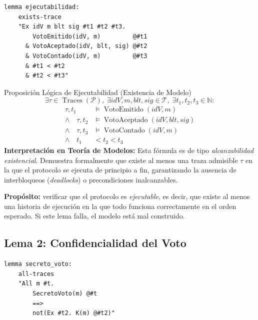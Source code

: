 \documentclass[12pt, a4paper, twoside, openright]{book}
\begin{document}
\begin{lstlisting}[caption={Lema de ejecutabilidad del protocolo completo.}]
lemma ejecutabilidad:
    exists-trace
    "Ex idV m blt sig #t1 #t2 #t3.
        VotoEmitido(idV, m)         @#t1
      & VotoAceptado(idV, blt, sig) @#t2
      & VotoContado(idV, m)         @#t3
      & #t1 < #t2
      & #t2 < #t3"
\end{lstlisting}

\begin{cajaLogica}{Proposici\'on L\'ogica de Ejecutabilidad (Existencia de Modelo)}
  \[
    \exists \tau \in \operatorname{Traces}(\mathcal{P}),\; \exists \mathit{idV}, m, \mathit{blt}, \mathit{sig} \in \mathcal{T},\; \exists t_1, t_2, t_3 \in \mathbb{N}:
  \]
  \[
    \begin{aligned}
      \tau, t_1 &\models \operatorname{VotoEmitido}(\mathit{idV}, m) \\
      \land\quad \tau, t_2 &\models \operatorname{VotoAceptado}(\mathit{idV}, \mathit{blt}, \mathit{sig}) \\
      \land\quad \tau, t_3 &\models \operatorname{VotoContado}(\mathit{idV}, m) \\
      \land\quad t_1 &< t_2 < t_3
    \end{aligned}
  \]
  \textbf{Interpretaci\'on en Teor\'ia de Modelos:} Esta f\'ormula es de tipo \emph{alcanzabilidad existencial}. Demuestra formalmente que existe al menos una traza admisible $\tau$ en la que el protocolo se ejecuta de principio a fin, garantizando la ausencia de interbloqueos (\emph{deadlocks}) o precondiciones inalcanzables.
\end{cajaLogica}

\textbf{Prop\'osito:} verificar que el protocolo es \textit{ejecutable},
es decir, que existe al menos una historia de ejecuci\'on en la que
todo funciona correctamente en el orden esperado. Si este lema falla,
el modelo est\'a mal construido.

\subsection{Lema 2: Confidencialidad del Voto}

\begin{lstlisting}[caption={Confidencialidad: el atacante Dolev-Yao no aprende el voto.}]
lemma secreto_voto:
    all-traces
    "All m #t.
        SecretoVoto(m) @#t
        ==>
        not(Ex #t2. K(m) @#t2)"
\end{lstlisting}
\end{document}

